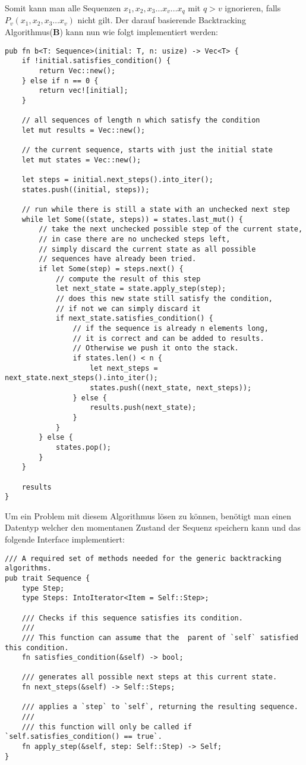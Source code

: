 Somit kann man alle Sequenzen $x_{1}, x_{2}, x_{3} \dots x_{v} \dots x_{q}$ mit $q > v$ ignorieren,
falls $P_{v}(x_{1}, x_{2}, x_{3} \dots x_{v})$ nicht gilt.
Der darauf basierende Backtracking Algorithmus(\textbf{B}) kann nun wie folgt implementiert werden:
\begin{verbatim}
pub fn b<T: Sequence>(initial: T, n: usize) -> Vec<T> {
    if !initial.satisfies_condition() {
        return Vec::new();
    } else if n == 0 {
        return vec![initial];
    }

    // all sequences of length n which satisfy the condition
    let mut results = Vec::new();

    // the current sequence, starts with just the initial state
    let mut states = Vec::new();

    let steps = initial.next_steps().into_iter();
    states.push((initial, steps));

    // run while there is still a state with an unchecked next step
    while let Some((state, steps)) = states.last_mut() {
        // take the next unchecked possible step of the current state,
        // in case there are no unchecked steps left,
        // simply discard the current state as all possible
        // sequences have already been tried.
        if let Some(step) = steps.next() {
            // compute the result of this step
            let next_state = state.apply_step(step);
            // does this new state still satisfy the condition,
            // if not we can simply discard it
            if next_state.satisfies_condition() {
                // if the sequence is already n elements long,
                // it is correct and can be added to results.
                // Otherwise we push it onto the stack.
                if states.len() < n {
                    let next_steps = next_state.next_steps().into_iter();
                    states.push((next_state, next_steps));
                } else {
                    results.push(next_state);
                }
            }
        } else {
            states.pop();
        }
    }

    results
}
\end{verbatim}
Um ein Problem mit diesem Algorithmus lösen zu können, benötigt man einen Datentyp welcher den momentanen Zustand
der Sequenz speichern kann und das folgende Interface implementiert:
\begin{verbatim}
/// A required set of methods needed for the generic backtracking algorithms.
pub trait Sequence {
    type Step;
    type Steps: IntoIterator<Item = Self::Step>;

    /// Checks if this sequence satisfies its condition.
    ///
    /// This function can assume that the  parent of `self` satisfied this condition.
    fn satisfies_condition(&self) -> bool;

    /// generates all possible next steps at this current state.
    fn next_steps(&self) -> Self::Steps;

    /// applies a `step` to `self`, returning the resulting sequence.
    ///
    /// this function will only be called if `self.satisfies_condition() == true`.
    fn apply_step(&self, step: Self::Step) -> Self;
}
\end{verbatim}